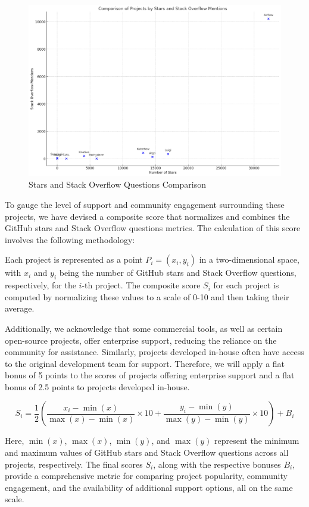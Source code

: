 \begin{figure}[htb]
    \centering
    \includegraphics[width=12cm]{graphics/Stars_stackoverflow_comparison.png}
    \caption[Stars and Stack overflow Questions Comparison]{Stars and Stack Overflow Questions Comparison}
    \label{abb:stars_stackoverflow_comparison}
\end{figure}

To gauge the level of support and community engagement surrounding these projects, we have devised a composite score that normalizes and combines the GitHub stars and Stack Overflow questions metrics. The calculation of this score involves the following methodology:

Each project is represented as a point \(P_i = (x_i, y_i)\) in a two-dimensional space, with \(x_i\) and \(y_i\) being the number of GitHub stars and Stack Overflow questions, respectively, for the \(i\)-th project. The composite score \(S_i\) for each project is computed by normalizing these values to a scale of 0-10 and then taking their average.

Additionally, we acknowledge that some commercial tools, as well as certain open-source projects, offer enterprise support, reducing the reliance on the community for assistance. Similarly, projects developed in-house often have access to the original development team for support. Therefore, we will apply a flat bonus of 5 points to the scores of projects offering enterprise support and a flat bonus of 2.5 points to projects developed in-house.

\[
S_i = \frac{1}{2} \left( \frac{x_i - \min(x)}{\max(x) - \min(x)} \times 10 + \frac{y_i - \min(y)}{\max(y) - \min(y)} \times 10 \right) + B_i
\]

Here, \(\min(x)\), \(\max(x)\), \(\min(y)\), and \(\max(y)\) represent the minimum and maximum values of GitHub stars and Stack Overflow questions across all projects, respectively. The final scores \(S_i\), along with the respective bonuses \(B_i\), provide a comprehensive metric for comparing project popularity, community engagement, and the availability of additional support options, all on the same scale.

